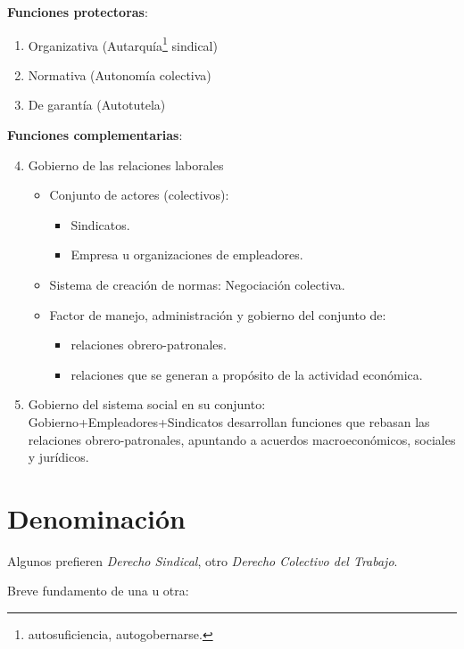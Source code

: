 \documentclass[spanish,12pt,a4paper,titlepage]{report}
\begin{document}
\textbf{Funciones protectoras}:
\begin{enumerate}
\item Organizativa (Autarquía\footnote{autosuficiencia, autogobernarse.} sindical)
\item Normativa (Autonomía colectiva)
\item De garantía (Autotutela)
\end{enumerate}

\textbf{Funciones complementarias}:
\begin{enumerate}
\setcounter{enumi}{3}
\item Gobierno de las relaciones laborales
  \begin{itemize}
  \item Conjunto de actores (colectivos):
    \begin{itemize}
    \item Sindicatos.
    \item Empresa u organizaciones de empleadores.
    \end{itemize}
  \item Sistema de creación de normas: Negociación colectiva.
  \item Factor de manejo, administración y gobierno del conjunto de:
    \begin{itemize}
    \item relaciones obrero-patronales.
    \item relaciones que se generan a propósito de la actividad económica.
    \end{itemize}
  \end{itemize}
\item Gobierno del sistema social en su conjunto: Gobierno+Empleadores+Sindicatos desarrollan funciones que rebasan las relaciones obrero-patronales, apuntando a acuerdos macroeconómicos, sociales y jurídicos.
\end{enumerate}

\section{Denominación}
\label{sec:denominacion}

Algunos prefieren \textit{Derecho Sindical}, otro \textit{Derecho Colectivo del Trabajo}.

Breve fundamento de una u otra:
\end{document}
